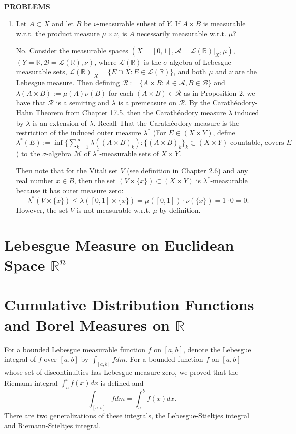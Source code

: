 \begin{center}
	\textbf{PROBLEMS}
\end{center}
\begin{enumerate}
	\setcounter{enumi}{0}
    \item Let $A\subset X$ and let $B$ be $\nu$-measurable subset of $Y$.
    If $A\times B$ is measurable w.r.t. the product measure $\mu\times\nu$, is $A$ necessarily measurable w.r.t. $\mu$?
    
    No.
    Consider the measurable spaces $(X=[0,1],\mathcal{A}=\mathcal{L}(\mathbb{R})|_X,\mu)$, $(Y=\mathbb{R},\mathcal{B}=\mathcal{L}(\mathbb{R}),\nu)$, where $\mathcal{L}(\mathbb{R})$ is the $\sigma$-algebra of Lebesgue-measurable sets, $\mathcal{L}(\mathbb{R})|_X=\{E\cap X:E\in\mathcal{L}(\mathbb{R})\}$, and both $\mu$ and $\nu$ are the Lebesgue measure.
    Then defining $\mathcal{R}:=\{A\times B:A\in\mathcal{A},B\in\mathcal{B}\}$ and $\lambda(A\times B):=\mu(A)\nu(B)$ for each $(A\times B)\in\mathcal{R}$ as in Proposition 2, we have that $\mathcal{R}$ is a semiring and $\lambda$ is a premeasure on $\mathcal{R}$.
    By the Carath\'eodory-Hahn Theorem from Chapter 17.5, then the Carath\'eodory measure $\overline\lambda$ induced by $\lambda$ is an extension of $\lambda$.
    Recall That the Carath\'eodory measure is the restriction of the induced outer measure $\lambda^*$ (For $E\in(X\times Y)$, define $\lambda^*(E):=\inf\{\sum_{k=1}^\infty\lambda((A\times B)_k):\{(A\times B)_k\}_k\subset (X\times Y)\text{ countable, covers }E $) to the $\sigma$-algebra $\mathcal{M}$ of $\lambda^*$-measurable sets of $X\times Y$.
    
    Then note that for the Vitali set $V$ (see definition in Chapter 2.6) and any real number $x\in B$, then the set $(V\times \{x\})\subset(X\times Y)$ is $\lambda^*$-measurable because it has outer measure zero: 
    \[
        \lambda^*(V\times\{x\})\le\lambda([0,1]\times\{x\})=\mu([0,1])\cdot\nu(\{x\})=1\cdot0=0.
    \]
    However, the set $V$ is not measurable w.r.t. $\mu$ by definition.

\end{enumerate}

\section{Lebesgue Measure on Euclidean Space $\mathbb{R}^n$}

\section{Cumulative Distribution Functions and Borel Measures on $\mathbb{R}$}
For a bounded Lebesgue measurable function $f$ on $[a,b]$, denote the Lebesgue integral of $f$ over $[a,b]$ by $\int_{[a,b]}fdm$.
For a bounded function $f$ on $[a,b]$ whose set of discontinuities has Lebesgue measure zero, we proved that the Riemann integral $\int_a^bf(x)dx$ is defined and 
\[
    \int_{[a,b]}fdm=\int_a^bf(x)dx.
\]
There are two generalizations of these integrals, the Lebesgue-Stieltjes integral and Riemann-Stieltjes integral.

